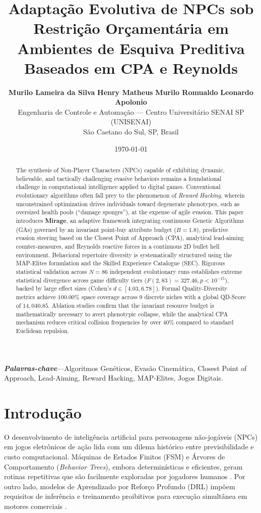 \documentclass[10pt,conference,twocolumn]{article}
\title{\textbf{Adaptação Evolutiva de NPCs sob Restrição Orçamentária em Ambientes de Esquiva Preditiva Baseados em CPA e Reynolds}}
\author{
  \textbf{Murilo Lameira da Silva} \quad \textbf{Henry Matheus} \quad \textbf{Murilo Romualdo} \quad \textbf{Leonardo Apolonio} \\
  Engenharia de Controle e Automação --- Centro Universitário SENAI SP (UNISENAI) \\
  São Caetano do Sul, SP, Brasil
}
\date{\today}
\begin{document}
\maketitle

\begin{abstract}
The synthesis of Non-Player Characters (NPCs) capable of exhibiting dynamic, believable, and tactically challenging evasive behaviors remains a foundational challenge in computational intelligence applied to digital games. Conventional evolutionary algorithms often fall prey to the phenomenon of \textit{Reward Hacking}, wherein unconstrained optimization drives individuals toward degenerate phenotypes, such as oversized health pools (``damage sponges''), at the expense of agile evasion. This paper introduces \textbf{Mirage}, an adaptive framework integrating continuous Genetic Algorithms (GAs) governed by an invariant point-buy attribute budget ($B = 1.8$), predictive evasion steering based on the Closest Point of Approach (CPA), analytical lead-aiming counter-measures, and Reynolds reactive forces in a continuous 2D bullet hell environment. Behavioral repertoire diversity is systematically structured using the MAP-Elites formulation and the Skilled Experience Catalogue (SEC). Rigorous statistical validation across $N = 86$ independent evolutionary runs establishes extreme statistical divergence across game difficulty tiers ($F(2, 83) = 327.46, p < 10^{-15}$), backed by large effect sizes (Cohen's $d \in [4.03, 6.78]$). Formal Quality-Diversity metrics achieve $100.00\%$ space coverage across 9 discrete niches with a global QD-Score of $14,040.85$. Ablation studies confirm that the invariant resource budget is mathematically necessary to avert phenotypic collapse, while the analytical CPA mechanism reduces critical collision frequencies by over $40\%$ compared to standard Euclidean repulsion.
\end{abstract}

\noindent\textbf{\textit{Palavras-chave}}---Algoritmos Genéticos, Evasão Cinemática, Closest Point of Approach, Lead-Aiming, Reward Hacking, MAP-Elites, Jogos Digitais.

\section{Introdução}
O desenvolvimento de inteligência artificial para personagens não-jogáveis (NPCs) em jogos eletrônicos de ação lida com um dilema histórico entre previsibilidade e custo computacional. Máquinas de Estados Finitos (FSM) e Árvores de Comportamento (\textit{Behavior Trees}), embora determinísticas e eficientes, geram rotinas repetitivas que são facilmente exploradas por jogadores humanos \cite{glavin2015skilled}. Por outro lado, modelos de Aprendizado por Reforço Profundo (DRL) impõem requisitos de inferência e treinamento proibitivos para execução simultânea em motores comerciais \cite{motta2016online}.
\end{document}
